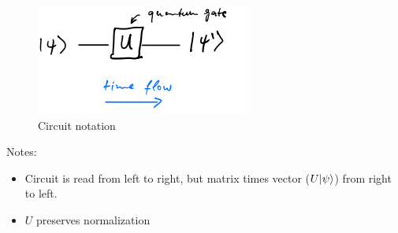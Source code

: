 \begin{figure}[h!]
    \centering
    \includegraphics[scale=0.5]{chapters/res/circuit_time_evolution.png}
    \caption{Circuit notation}
\end{figure}

Notes: 
\begin{itemize}
    \item Circuit is read from left to right, but matrix times vector ($U\lvert\psi\rangle$) from right to left.
    \item $U$ preserves normalization
\end{itemize}

